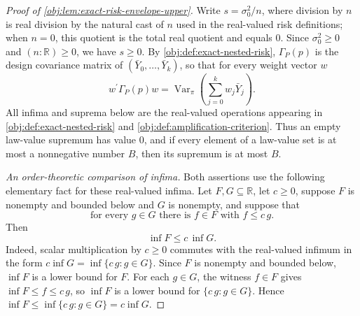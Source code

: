 \documentclass[11pt]{article}
\begin{document}
\begin{proof}[Proof of \cref{obj:lem:exact-risk-envelope-upper}]
Write \(s=\sigma_0^2/n\), where division by \(n\) is real division by the natural cast of \(n\) used in the real-valued risk definitions; when \(n=0\), this quotient is the total real quotient and equals \(0\). Since \(\sigma_0^2\ge0\) and \((n:\mathbb R)\ge0\), we have \(s\ge0\). By \cref{obj:def:exact-nested-risk}, \(\Gamma_P(p)\) is the design covariance matrix of \((\bar Y_0,\ldots,\bar Y_k)\), so that for every weight vector \(w\)
\[
w^\prime\Gamma_P(p)w
=
\operatorname{Var}_\pi\!\left(\sum_{j=0}^k w_j\bar Y_j\right).
\]
All infima and suprema below are the real-valued operations appearing in \cref{obj:def:exact-nested-risk} and \cref{obj:def:amplification-criterion}. Thus an empty law-value supremum has value \(0\), and if every element of a law-value set is at most a nonnegative number \(B\), then its supremum is at most \(B\).

\emph{An order-theoretic comparison of infima.}
Both assertions use the following elementary fact for these real-valued infima. Let \(F,G\subseteq\mathbb R\), let \(c\ge0\), suppose \(F\) is nonempty and bounded below and \(G\) is nonempty, and suppose that
\[
\text{for every }g\in G\text{ there is }f\in F\text{ with } f\le c\,g .
\]
Then
\[
\inf F\le c\,\inf G .
\]
Indeed, scalar multiplication by \(c\ge0\) commutes with the real-valued infimum in the form \(c\inf G=\inf\{c\,g:g\in G\}\). Since \(F\) is nonempty and bounded below, \(\inf F\) is a lower bound for \(F\). For each \(g\in G\), the witness \(f\in F\) gives \(\inf F\le f\le c\,g\), so \(\inf F\) is a lower bound for \(\{c\,g:g\in G\}\). Hence \(\inf F\le\inf\{c\,g:g\in G\}=c\inf G\). %


\end{proof}
\end{document}
